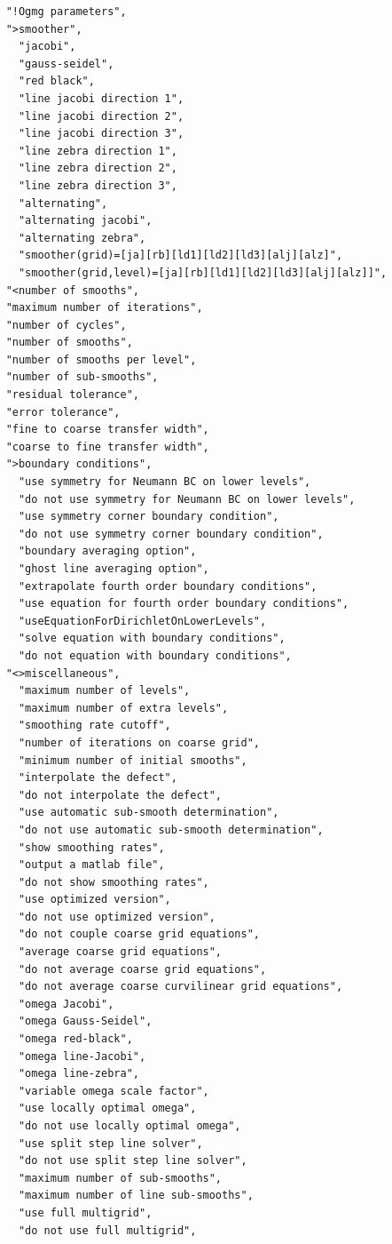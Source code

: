 \documentclass{article}
\begin{document}
\begin{verbatim}
    "!Ogmg parameters",
    ">smoother",
      "jacobi",
      "gauss-seidel",
      "red black",
      "line jacobi direction 1",
      "line jacobi direction 2",
      "line jacobi direction 3",
      "line zebra direction 1",
      "line zebra direction 2",
      "line zebra direction 3",
      "alternating",
      "alternating jacobi",
      "alternating zebra",
      "smoother(grid)=[ja][rb][ld1][ld2][ld3][alj][alz]",
      "smoother(grid,level)=[ja][rb][ld1][ld2][ld3][alj][alz]]",
    "<number of smooths",
    "maximum number of iterations",
    "number of cycles",
    "number of smooths",
    "number of smooths per level",
    "number of sub-smooths",
    "residual tolerance",
    "error tolerance",
    "fine to coarse transfer width",
    "coarse to fine transfer width",
    ">boundary conditions",
      "use symmetry for Neumann BC on lower levels",
      "do not use symmetry for Neumann BC on lower levels",
      "use symmetry corner boundary condition",
      "do not use symmetry corner boundary condition",
      "boundary averaging option",
      "ghost line averaging option",
      "extrapolate fourth order boundary conditions",
      "use equation for fourth order boundary conditions",
      "useEquationForDirichletOnLowerLevels",
      "solve equation with boundary conditions",
      "do not equation with boundary conditions",
    "<>miscellaneous",
      "maximum number of levels",
      "maximum number of extra levels",
      "smoothing rate cutoff",
      "number of iterations on coarse grid",
      "minimum number of initial smooths",
      "interpolate the defect",
      "do not interpolate the defect",
      "use automatic sub-smooth determination",
      "do not use automatic sub-smooth determination",
      "show smoothing rates",
      "output a matlab file",
      "do not show smoothing rates",
      "use optimized version",
      "do not use optimized version",
      "do not couple coarse grid equations",
      "average coarse grid equations",
      "do not average coarse grid equations",
      "do not average coarse curvilinear grid equations",
      "omega Jacobi",
      "omega Gauss-Seidel",
      "omega red-black",
      "omega line-Jacobi",
      "omega line-zebra",
      "variable omega scale factor",
      "use locally optimal omega",
      "do not use locally optimal omega",
      "use split step line solver",
      "do not use split step line solver",
      "maximum number of sub-smooths",
      "maximum number of line sub-smooths",
      "use full multigrid",
      "do not use full multigrid",

\end{verbatim}
\end{document}
